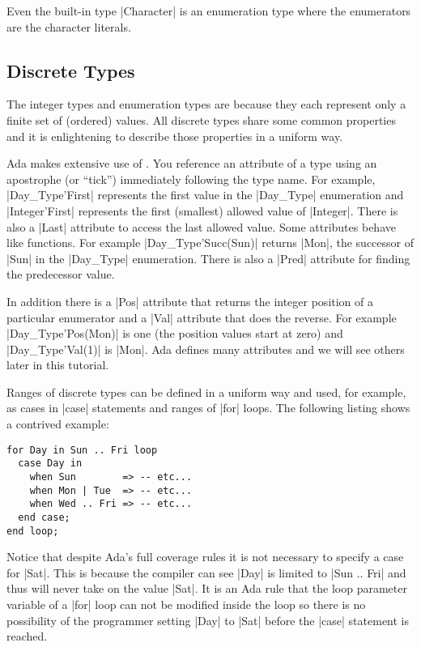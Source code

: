 \noindent Even the built-in type |Character| is an enumeration type where the enumerators are
the character literals.

\subsection{Discrete Types}

The integer types and enumeration types are  because they each represent
only a finite set of (ordered) values. All discrete types share some common properties and it is
enlightening to describe those properties in a uniform way.

Ada makes extensive use of . You reference an attribute of a type using an
apostrophe (or ``tick'') immediately following the type name. For example, |Day_Type'First|
represents the first value in the |Day_Type| enumeration and |Integer'First| represents the
first (smallest) allowed value of |Integer|. There is also a |Last| attribute to access the last
allowed value. Some attributes behave like functions. For example |Day_Type'Succ(Sun)| returns
|Mon|, the successor of |Sun| in the |Day_Type| enumeration. There is also a |Pred| attribute
for finding the predecessor value.

In addition there is a |Pos| attribute that returns the integer position of a particular
enumerator and a |Val| attribute that does the reverse. For example |Day_Type'Pos(Mon)| is one
(the position values start at zero) and |Day_Type'Val(1)| is |Mon|. Ada defines many attributes
and we will see others later in this tutorial.

Ranges of discrete types can be defined in a uniform way and used, for example, as cases in
|case| statements and ranges of |for| loops. The following listing shows a contrived example:

\begin{lstlisting}
for Day in Sun .. Fri loop
  case Day in
    when Sun        => -- etc...
    when Mon | Tue  => -- etc...
    when Wed .. Fri => -- etc...
  end case;
end loop;
\end{lstlisting}

\noindent Notice that despite Ada's full coverage rules it is not necessary to specify a case
for |Sat|. This is because the compiler can see |Day| is limited to |Sun .. Fri| and thus will
never take on the value |Sat|. It is an Ada rule that the loop parameter variable of a |for|
loop can not be modified inside the loop so there is no possibility of the programmer setting
|Day| to |Sat| before the |case| statement is reached.

